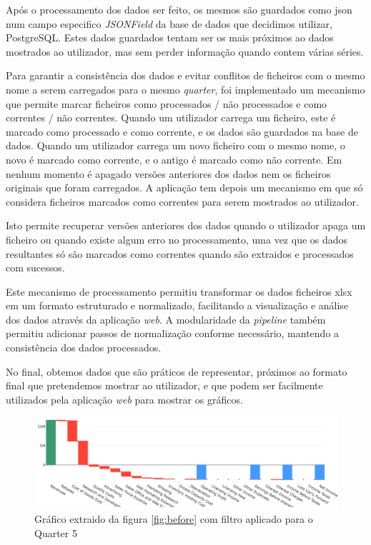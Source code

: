 Após o processamento dos dados ser feito, os mesmos são guardados como \gls{json} num campo especifico \textit{JSONField} da base de dados que decidimos utilizar, PostgreSQL. Estes dados guardados tentam ser os mais próximos ao dados mostrados ao utilizador, mas sem perder informação quando contem várias séries.

Para garantir a consistência dos dados e evitar conflitos de ficheiros com o mesmo nome a serem carregados para o mesmo \textit{quarter}, foi implementado um mecanismo que permite marcar ficheiros como processados / não processados e como correntes / não correntes. Quando um utilizador carrega um ficheiro, este é marcado como processado e como corrente, e os dados são guardados na base de dados. Quando um utilizador carrega um novo ficheiro com o mesmo nome, o novo é marcado como corrente, e o antigo é marcado como não corrente. Em nenhum momento é apagado versões anteriores dos dados nem os ficheiros originais que foram carregados. A aplicação tem depois um mecanismo em que só considera ficheiros marcados como correntes para serem mostrados ao utilizador.

Isto permite recuperar versões anteriores dos dados quando o utilizador apaga um ficheiro ou quando existe algum erro no processamento, uma vez que os dados resultantes só são marcados como correntes quando são extraidos e processados com sucessos.

Este mecanismo de processamento permitiu transformar os dados ficheiros \gls{xlsx} em um formato estruturado e normalizado, facilitando a visualização e análise dos dados através da aplicação \textit{web}. A modularidade da \textit{pipeline} também permitiu adicionar passos de normalização conforme necessário, mantendo a consistência dos dados processados.

No final, obtemos dados que são práticos de representar, próximos ao formato final que pretendemos mostrar ao utilizador, e que podem ser facilmente utilizados pela aplicação \textit{web} para mostrar os gráficos.

\begin{figure}[H]
\centering
\includegraphics[max width=\textwidth]{./img/after}
\caption{Gráfico extraido da figura \ref{fig:before} com filtro aplicado para o Quarter 5}
\label{fig:after}
\end{figure}

